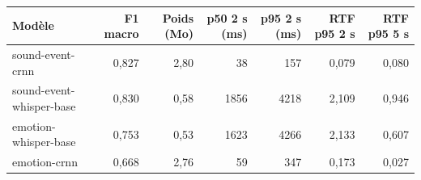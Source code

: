 \begin{tabular}{@{}lrrrrrr@{}}
\toprule
Modèle & F1 macro & Poids (Mo) & p50 2 s (ms) & p95 2 s (ms) & RTF p95 2 s & RTF p95 5 s \\
\midrule
sound-event-crnn & 0{,}827 & 2{,}80 & 38 & 157 & 0{,}079 & 0{,}080 \\
sound-event-whisper-base & 0{,}830 & 0{,}58 & 1856 & 4218 & 2{,}109 & 0{,}946 \\
emotion-whisper-base & 0{,}753 & 0{,}53 & 1623 & 4266 & 2{,}133 & 0{,}607 \\
emotion-crnn & 0{,}668 & 2{,}76 & 59 & 347 & 0{,}173 & 0{,}027 \\
\bottomrule
\end{tabular}
